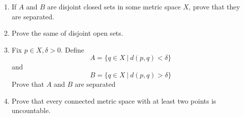 $ $

\begin{enumerate}
	\item If $A$ and $B$ are disjoint closed sets in some metric space $X$, prove that they are separated.
	\item Prove the same of disjoint open sets.
	\item Fix $p \in X,\delta > 0$. Define
	$$A = \{q \in X ~|~ d(p,q) < \delta\}$$
	and 
	$$B = \{q \in X ~|~ d(p,q) > \delta\}$$
	Prove that $A$ and $B$ are separated
	\item Prove that every connected metric space with at least two points is uncountable.
\end{enumerate}